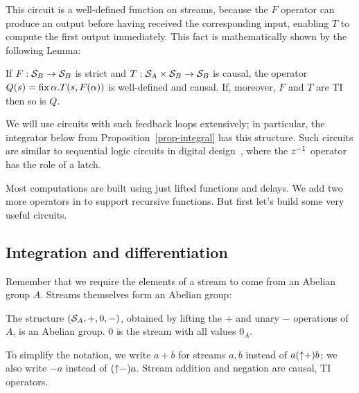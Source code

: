 This circuit is a well-defined function on streams, because the $F$
operator can produce an output before having received the
corresponding input, enabling $T$ to compute the first output
immediately.  This fact is mathematically shown by the following
Lemma:


\begin{lemma}\label{feedback-semantics}
\label{cor-loop}
If $F: \mathcal{S}_{B} \to \mathcal{S}_{B}$ is strict and $T: \mathcal{S}_{A} \times \mathcal{S}_{B} \to \mathcal{S}_{B}$ is causal,
the operator $Q(s)=\mbox{fix}\,\alpha.T(s,F(\alpha))$ is well-defined and causal.
If, moreover, $F$ and $T$ are TI then so is $Q$.
\end{lemma}

We will use circuits with such feedback loops extensively; in
particular, the integrator below from Proposition~\ref{prop-integral}
has this structure.  Such circuits are similar to sequential logic
circuits in digital design~\cite{sequential-logic}, where the $z^{-1}$
operator has the role of a latch.

Most \dbsp computations are built using just lifted functions and
delays.  We add two more operators in  to support
recursive functions.  But first let's build some very useful circuits.

\subsection{Integration and differentiation}\label{sec:abelianstreams}

Remember that we require the elements of a stream to come from an
Abelian group $A$.  Streams themselves form an Abelian group:

\begin{proposition}
The structure $(\mathcal{S}_{A},+,0,-)$, obtained by lifting the $+$ and
unary $-$ operations of $A$, is an Abelian group.  $0$ is the stream
with all values $0_A$.
\end{proposition}

\noindent
To simplify the notation, we write $a + b$ for streams $a, b$ instead
of $a ({\uparrow}+) b$; we also write $-a$ instead of $({\uparrow}-)a$.
Stream addition and negation are causal, TI operators.

